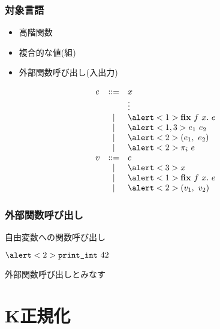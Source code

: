 \documentclass[dvipdfmx,cjk,xcolor=dvipsnames,envcountsect,notheorems,12pt]{beamer}
\theoremstyle{definition}
\newcommand{\keyword}[1]{\mathbf{#1}}
\newcommand{\FIX}{\keyword{fix}}
\begin{document}
\begin{frame}
	\frametitle{対象言語}
	\Large
	\begin{itemize}
		\item \alert<1>{高階関数}
		\item \alert<2>{複合的な値(組)}
		\item \alert<3>{外部関数呼び出し(入出力)}
	\end{itemize}
	{\normalsize
	\[ \begin{array}{lcl}
		e & ::= & x	\\
				& & \vdots \\
				& | & \alert<1>{\FIX~f~x.~e} \\
				& | & \alert<1,3>{e_1~e_2} \\
				& | & \alert<2>{(e_1,~e_2)} \\
				& | & \alert<2>{\pi_i~e} \\
			v & ::= & c \\
				& | & \alert<3>{x} \\
				& | & \alert<1>{\FIX~f~x.~e} \\
				& | & \alert<2>{(v_1,~v_2)} \\
	\end{array} \]}
	\pause
	\pause
\end{frame}

\begin{frame}
	\frametitle{外部関数呼び出し}
	\LARGE \alert<2>{自由変数}への関数呼び出し

	\vfill

	\begin{center}
		\Large
		$ \alert<2>{\texttt{print\_int}}~42 $
	\end{center}

	\vfill

	外部関数呼び出しとみなす

	\pause
\end{frame}

\section{K正規化}
\end{document}
